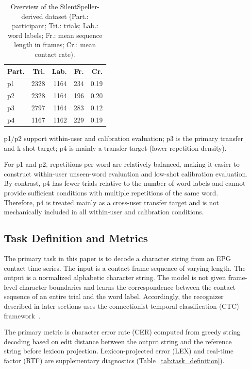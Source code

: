 \begin{table}[t]
\centering
\caption{Overview of the SilentSpeller-derived dataset (Part.: participant; Tri.: trials; Lab.: word labels; Fr.: mean sequence length in frames; Cr.: mean contact rate).}
\label{tab:dataset_summary}
\setlength{\tabcolsep}{1.5pt}
\renewcommand{\arraystretch}{1.05}
\begin{tabular}{@{}lrrrr@{}}
\toprule
Part. & Tri. & Lab. & Fr. & Cr. \\
\midrule
p1 & 2328 & 1164 & 234 & 0.19 \\
p2 & 2328 & 1164 & 196 & 0.20 \\
p3 & 2797 & 1164 & 283 & 0.12 \\
p4 & 1167 & 1162 & 229 & 0.19 \\
\bottomrule
\end{tabular}
\end{table}
p1/p2 support within-user and calibration evaluation; p3 is the primary transfer and k-shot target; p4 is mainly a transfer target (lower repetition density).

For p1 and p2, repetitions per word are relatively balanced, making it easier to construct within-user unseen-word evaluation and low-shot calibration evaluation.
By contrast, p4 has fewer trials relative to the number of word labels and cannot provide sufficient conditions with multiple repetitions of the same word.
Therefore, p4 is treated mainly as a cross-user transfer target and is not mechanically included in all within-user and calibration conditions.

\subsection{Task Definition and Metrics}
\label{sec:task:definition}

The primary task in this paper is to decode a character string from an EPG contact time series.
The input is a contact frame sequence of varying length.
The output is a normalized alphabetic character string.
The model is not given frame-level character boundaries and learns the correspondence between the contact sequence of an entire trial and the word label.
Accordingly, the recognizer described in later sections uses the connectionist temporal classification (CTC) framework~\cite{graves2006connectionist}.

The primary metric is character error rate (CER) computed from greedy string decoding based on edit distance between the output string and the reference string before lexicon projection.
Lexicon-projected error (LEX) and real-time factor (RTF) are supplementary diagnostics (Table~\ref{tab:task_definition}).

